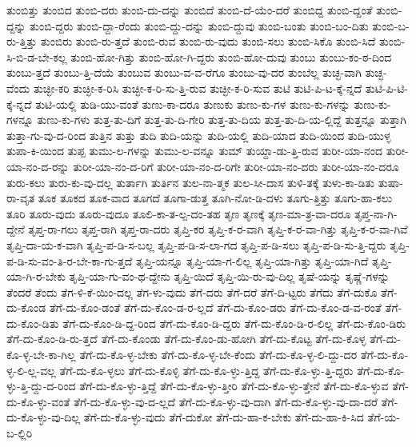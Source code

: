 {ತುಂಬಿತ್ತು
ತುಂಬಿದ
ತುಂಬಿ-ದರು
ತುಂಬಿ-ದು-ದನ್ನು
ತುಂಬಿದೆ
ತುಂಬಿ-ದೆ-ಯೆಂ-ದರೆ
ತುಂಬಿದ್ದ
ತುಂಬಿ-ದ್ದಂತೆ
ತುಂಬಿ-ದ್ದನ್ನು
ತುಂಬಿ-ದ್ದರು
ತುಂಬಿ-ದ್ದಾ-ರೆಂದು
ತುಂಬಿ-ದ್ದು-ದನ್ನು
ತುಂಬಿ-ದ್ದುವು
ತುಂಬಿ-ಬಂತು
ತುಂಬಿ-ಬಂ-ದಿತು
ತುಂಬಿ-ಬ-ರು-ತ್ತಿತ್ತು
ತುಂಬಿರು
ತುಂಬಿ-ರು-ತ್ತದೆ
ತುಂಬಿ-ರುವ
ತುಂಬಿ-ರು-ವುದು
ತುಂಬಿ-ಸಲು
ತುಂಬಿ-ಸಿಕೊ
ತುಂಬಿ-ಸಿದೆ
ತುಂಬಿ-ಸಿ-ಬಿ-ಡ-ಬೇ-ಕಲ್ಲ
ತುಂಬಿ-ಹೋ-ಗಿತ್ತು
ತುಂಬಿ-ಹೋ-ಗಿ-ದ್ದರು
ತುಂಬಿ-ಹೋ-ದುವು
ತುಂಬು
ತುಂಬು-ಕಂ-ಠ-ದಿಂದ
ತುಂಬು-ತ್ತದೆ
ತುಂಬು-ತ್ತಿ-ದೆಯೆ
ತುಂಬುವ
ತುಂಬು-ವ-ವ-ರೆಗೂ
ತುಂಬು-ವು-ದರ
ತುಂಬೆಲ್ಲ
ತುಚ್ಛ-ವಾಗಿ
ತುಚ್ಛ-ವೆಂದು
ತುಚ್ಛೀ-ಕರಿ
ತುಚ್ಛೀ-ಕ-ರಿಸಿ
ತುಚ್ಛೀ-ಕ-ರಿ-ಸು-ತ್ತಿ-ರುವ
ತುಚ್ಛೀ-ಕ-ರಿ-ಸುವ
ತುಟಿ
ತುಟಿ-ಪಿ-ಟ-ಕ್ಕೆ-ನ್ನದೆ
ತುಟಿ-ಪಿ-ಟಿ-ಕ್ಕೆ-ನ್ನದೆ
ತುಟಿ-ಯಲ್ಲಿ
ತುಡಿ-ಯು-ವಂತೆ
ತುಣು-ಕಾ-ದರೂ
ತುಣುಕು
ತುಣು-ಕು-ಗಳ
ತುಣು-ಕು-ಗಳನ್ನು
ತುಣು-ಕು-ಗಳನ್ನೂ
ತುಣು-ಕು-ಗಳು
ತುತ್ತ-ತು-ದಿಗೆ
ತುತ್ತ-ತು-ದಿ-ಗೇರಿ
ತುತ್ತ-ತು-ದಿಯ
ತುತ್ತ-ತು-ದಿ-ಯ-ಲ್ಲಿದ್ದೆ
ತುತ್ತನ್ನೂ
ತುತ್ತಾಗಿ
ತುತ್ತಾ-ಗು-ವು-ದ-ರಿಂದ
ತುತ್ತಿನ
ತುತ್ತು
ತುದಿ
ತುದಿ-ಯನ್ನು
ತುದಿ-ಯಲ್ಲಿ
ತುದಿ-ಯಾದ
ತುದಿ-ಯಿಂದ
ತುದಿ-ಯುಳ್ಳ
ತುಪಾ-ಕಿ-ಯಿಂದ
ತುಪ್ಪ
ತುಮು-ಲ-ಗಳನ್ನು
ತುಮು-ಲ-ವನ್ನೂ
ತುಮ್
ತುಯ್ದಾ-ಡು-ತ್ತಿ-ರುವ
ತುರೀ-ಯಾ-ನಂದ
ತುರೀ-ಯಾ-ನಂ-ದ-ರನ್ನು
ತುರೀ-ಯಾ-ನಂ-ದ-ರಿಗೆ
ತುರೀ-ಯಾ-ನಂ-ದ-ರಿಗೇ
ತುರೀ-ಯಾ-ನಂ-ದರು
ತುರೀ-ಯಾ-ನಂ-ದರೂ
ತುರು-ಕಲು
ತುರು-ಕು-ವು-ದಲ್ಲ
ತುರ್ತಾಗಿ
ತುರ್ತಿನ
ತುಲ-ನಾ-ತ್ಮಕ
ತುಲ-ಸೀ-ದಾಸ
ತುಳಿ-ತಕ್ಕೆ
ತುಳು-ಕಾ-ಡಿತು
ತುಷಾ-ರಾ-ವೃತ
ತೂಕ
ತೂಕದ
ತೂಕ-ವಾದ
ತೂಗದೆ
ತೂಗಾ-ಡುತ್ತ
ತೂಗಿ-ನೋ-ಡಿ-ದಳು
ತೂಗು-ತ್ತಿತ್ತು
ತೂಗು-ಹಾ-ಕಲು
ತೂರಿ
ತೂರು-ವುದು
ತೂರು-ವುದೂ
ತೂಲಿ-ಕಾ-ತ-ಲ್ಪ-ದಂ-ತಹ
ತೃಣ
ತೃಣಕ್ಕೆ
ತೃಣ-ಮಾ-ತ್ರ-ವಾ-ದರೂ
ತೃಪ್ತ-ನಾ-ಗಿ-ದ್ದೇನೆ
ತೃಪ್ತ-ರಾ-ಗಲು
ತೃಪ್ತ-ರಾಗಿ
ತೃಪ್ತ-ರಾ-ದರು
ತೃಪ್ತಿ-ಕರ
ತೃಪ್ತಿ-ಕ-ರ-ವಾಗಿ
ತೃಪ್ತಿ-ಕ-ರ-ವಾ-ಗಿತ್ತು
ತೃಪ್ತಿ-ಕ-ರ-ವಾ-ಗಿವೆ
ತೃಪ್ತಿ-ದಾ-ಯ-ಕ-ವಾಗಿ
ತೃಪ್ತಿ-ಪ-ಡಿ-ಸ-ಬಲ್ಲ
ತೃಪ್ತಿ-ಪ-ಡಿ-ಸ-ಲಾ-ಗದ
ತೃಪ್ತಿ-ಪ-ಡಿ-ಸಲು
ತೃಪ್ತಿ-ಪ-ಡಿ-ಸು-ತ್ತಿ-ದ್ದರು
ತೃಪ್ತಿ-ಪ-ಡಿ-ಸು-ವಂ-ತಿ-ರ-ಬೇ-ಕಾ-ಗು-ತ್ತದೆ
ತೃಪ್ತಿ-ಯನ್ನೂ
ತೃಪ್ತಿ-ಯಾ-ಗ-ಲಿಲ್ಲ
ತೃಪ್ತಿ-ಯಾ-ಗಿತ್ತು
ತೃಪ್ತಿ-ಯಾ-ಗಿದೆ
ತೃಪ್ತಿ-ಯಾ-ಗಿ-ರ-ಬೇಕು
ತೃಪ್ತಿ-ಯಾ-ಗು-ವಂ-ಥ-ದ್ದೇನು
ತೃಪ್ತಿ-ಯಿದೆ
ತೃಪ್ತಿ-ಯಿ-ರು-ವು-ದಿಲ್ಲ
ತೃಷೆ-ಯನ್ನು
ತೃಷ್ಣೆ-ಗಳನ್ನು
ತೆಂದರೆ
ತೆಂದು
ತೆಗ-ಳಿ-ಕೆ-ಯಿಂ-ದಲ್ಲ
ತೆಗ-ಳು-ವುದು
ತೆಗೆ-ದರು
ತೆಗೆ-ದರೆ
ತೆಗೆ-ದಿ-ಟ್ಟರು
ತೆಗೆದು
ತೆಗೆ-ದುಕೊ
ತೆಗೆ-ದು-ಕೊಂಡ
ತೆಗೆ-ದು-ಕೊಂ-ಡಂತೆ
ತೆಗೆ-ದು-ಕೊಂ-ಡ-ರ-ಲ್ಲದೆ
ತೆಗೆ-ದು-ಕೊಂ-ಡರು
ತೆಗೆ-ದು-ಕೊಂ-ಡ-ವ-ರಂತೆ
ತೆಗೆ-ದು-ಕೊಂ-ಡಿತು
ತೆಗೆ-ದು-ಕೊಂ-ಡಿ-ದ್ದ-ರಿಂದ
ತೆಗೆ-ದು-ಕೊಂ-ಡಿ-ದ್ದರು
ತೆಗೆ-ದು-ಕೊಂ-ಡಿ-ರ-ಲಿಲ್ಲ
ತೆಗೆ-ದು-ಕೊಂ-ಡಿರು
ತೆಗೆ-ದು-ಕೊಂ-ಡಿ-ರು-ತ್ತದೆ
ತೆಗೆ-ದು-ಕೊಂಡು
ತೆಗೆ-ದು-ಕೊಂ-ಡು-ಹೋಗಿ
ತೆಗೆ-ದು-ಕೊಟ್ಟ
ತೆಗೆ-ದು-ಕೊಳ್ಳ
ತೆಗೆ-ದು-ಕೊ-ಳ್ಳ-ಬೇ-ಕಾ-ಗಿಲ್ಲ
ತೆಗೆ-ದು-ಕೊ-ಳ್ಳ-ಬೇಕು
ತೆಗೆ-ದು-ಕೊ-ಳ್ಳ-ಬೇ-ಕೆಂದು
ತೆಗೆ-ದು-ಕೊ-ಳ್ಳ-ಲಿ-ದ್ದು-ದರ
ತೆಗೆ-ದು-ಕೊ-ಳ್ಳ-ಲಿ-ಲ್ಲ-ವಲ್ಲ
ತೆಗೆ-ದು-ಕೊ-ಳ್ಳಲು
ತೆಗೆ-ದು-ಕೊಳ್ಳಿ
ತೆಗೆ-ದು-ಕೊ-ಳ್ಳು-ತ್ತಿದ್ದ
ತೆಗೆ-ದು-ಕೊ-ಳ್ಳು-ತ್ತಿ-ದ್ದರು
ತೆಗೆ-ದು-ಕೊ-ಳ್ಳು-ತ್ತಿ-ದ್ದು-ದ-ರಿಂದ
ತೆಗೆ-ದು-ಕೊ-ಳ್ಳು-ತ್ತಿದ್ದೆ
ತೆಗೆ-ದು-ಕೊ-ಳ್ಳು-ತ್ತೀರಿ
ತೆಗೆ-ದು-ಕೊ-ಳ್ಳು-ತ್ತೇನೆ
ತೆಗೆ-ದು-ಕೊ-ಳ್ಳುವ
ತೆಗೆ-ದು-ಕೊ-ಳ್ಳು-ವಂತೆ
ತೆಗೆ-ದು-ಕೊ-ಳ್ಳು-ವು-ದ-ಲ್ಲದೆ
ತೆಗೆ-ದು-ಕೊ-ಳ್ಳು-ವು-ದಾಗಿ
ತೆಗೆ-ದು-ಕೊ-ಳ್ಳು-ವು-ದಾ-ದರೆ
ತೆಗೆ-ದು-ಕೊ-ಳ್ಳು-ವು-ದಿಲ್ಲ
ತೆಗೆ-ದು-ಕೊ-ಳ್ಳು-ವುದು
ತೆಗೆ-ದುಕೋ
ತೆಗೆ-ದು-ಹಾ-ಕ-ಬೇಕು
ತೆಗೆ-ದು-ಹಾ-ಕಿ-ಸಿದ
ತೆಗೆ-ಯ-ಬ-ಲ್ಲಿರಿ
}
